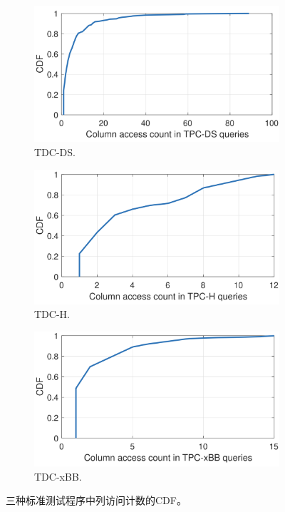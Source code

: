 \begin{figure}[]
    \centering
    \begin{subfigure}[t]{0.5\textwidth}
        \centering
        \includegraphics[width=1\textwidth]{img/motivation/ds-count-cdf}
        \caption{TDC-DS.}
        \label{fig:ds-count-cdf}
    \end{subfigure}%

    \begin{subfigure}[t]{0.5\textwidth}
        \centering
        \includegraphics[width=1\textwidth]{img/motivation/h-count-cdf}
        \caption{TDC-H.}
        \label{fig:h-count-cdf}
    \end{subfigure}%

    \begin{subfigure}[t]{0.5\textwidth}
        \centering
        \includegraphics[width=1\textwidth]{img/motivation/xbb-count-cdf}
        \caption{TDC-xBB.}
        \label{fig:bb-count-cdf}
    \end{subfigure}%
    \caption{三种标准测试程序中列访问计数的CDF。}
    \label{fig:count-cdf}
\end{figure}


